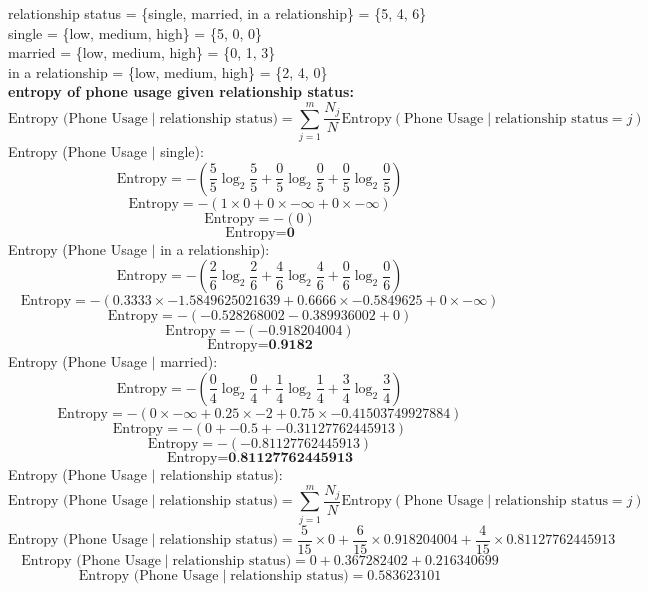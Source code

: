 \documentclass[a3paper,12pt]{extarticle} %
\begin{document}
\begin{enumerate}
\[    \]
    relationship status = \{single, married, in a relationship\} = \{5, 4, 6\}
    \\ single = \{low, medium, high\} = \{5, 0, 0\}
    \\ married = \{low, medium, high\} = \{0, 1, 3\}
    \\ in a relationship = \{low, medium, high\} = \{2, 4, 0\}
    \\ \textbf{entropy of phone usage given relationship status:}
    \[
    \text{Entropy (Phone Usage} \mid \text{relationship status)} = \sum_{j=1}^m \frac{N_j}{N} \text{Entropy}(\text{Phone Usage} \mid \text{relationship status} = j)
    \]
    Entropy (Phone Usage $\mid$ single):
    \[
    \text{Entropy} = -\left(\frac{5}{5} \log_2 \frac{5}{5} + \frac{0}{5} \log_2 \frac{0}{5} + \frac{0}{5} \log_2 \frac{0}{5}\right)
    \]
    \[
    \text{Entropy} = -\left(1 \times 0 + 0 \times -\infty + 0 \times -\infty\right)
    \]
    \[
    \text{Entropy} = -\left(0\right)
    \]
    \[
    \text{Entropy} = \textbf{0}
    \]
    Entropy (Phone Usage $\mid$ in a relationship):
    \[
    \text{Entropy} = -\left(\frac{2}{6} \log_2 \frac{2}{6} + \frac{4}{6} \log_2 \frac{4}{6} + \frac{0}{6} \log_2 \frac{0}{6}\right)
    \]
    \[
    \text{Entropy} = -\left(0.3333 \times -1.5849625021639 + 0.6666 \times -0.5849625 + 0 \times -\infty\right)
    \]
    \[
    \text{Entropy} = -\left(-0.528268002 - 0.389936002 + 0\right)
    \]
    \[
    \text{Entropy} = -\left(-0.918204004\right)
    \]
    \[
    \text{Entropy} = \textbf{0.9182}
    \]
    Entropy (Phone Usage $\mid$ married):
    \[
    \text{Entropy} = -\left(\frac{0}{4} \log_2 \frac{0}{4} + \frac{1}{4} \log_2 \frac{1}{4} + \frac{3}{4} \log_2 \frac{3}{4}\right)
    \]
    \[
    \text{Entropy} = -\left(0 \times -\infty + 0.25 \times -2 + 0.75 \times -0.41503749927884\right)
    \]
    \[
    \text{Entropy} = -\left(0 + -0.5 + -0.31127762445913\right)
    \]
    \[
    \text{Entropy} = -\left(-0.81127762445913\right)
    \]
    \[
    \text{Entropy} = \textbf{0.81127762445913}
    \]
    Entropy (Phone Usage $\mid$ relationship status):
    \[
    \text{Entropy (Phone Usage} \mid \text{relationship status)} = \sum_{j=1}^m \frac{N_j}{N} \text{Entropy}(\text{Phone Usage} \mid \text{relationship status} = j)
    \]
    \[
    \text{Entropy (Phone Usage} \mid \text{relationship status)} = \frac{5}{15} \times 0 + \frac{6}{15} \times 0.918204004 + \frac{4}{15} \times 0.81127762445913
    \]
    \[
    \text{Entropy (Phone Usage} \mid \text{relationship status)} = 0 + 0.367282402 + 0.216340699
    \]
    \[
    \text{Entropy (Phone Usage} \mid \text{relationship status)} = 0.583623101
\]
\end{enumerate}
\end{document}
